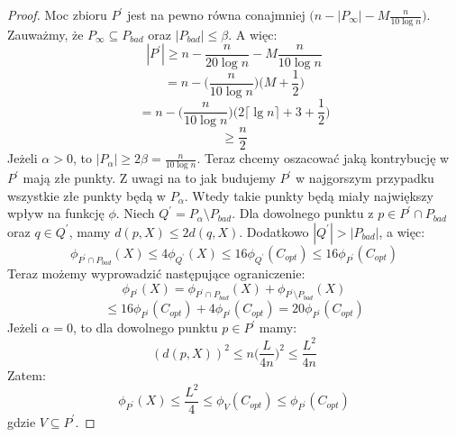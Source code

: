 \begin{proof}
    Moc zbioru $P^{'}$ jest na pewno równa conajmniej $\Big(n - |P_{\infty}| - M\frac{n}{10 \log n} \Big)$.
    Zauważmy, że $P_{\infty} \subseteq P_{bad}$ oraz $|P_{bad}| \leq \beta$.
    A więc:
    \begin{equation}
        |P^{'}| \geq n - \frac{n}{20 \log n} - M \frac{n}{10 \log n}
    \end{equation}
    \begin{equation}
        = n - \Big(\frac{n}{10 \log n}\Big) \Big(M + \frac{1}{2}\Big)
    \end{equation}
    \begin{equation}
        = n - \Big(\frac{n}{10 \log n}\Big) \Big(2 \lceil \lg n \rceil + 3 + \frac{1}{2}\Big)
    \end{equation}
    \begin{equation}
        \geq \frac{n}{2}
    \end{equation}
    Jeżeli $\alpha > 0$, to $|P_{\alpha}| \geq 2\beta = \frac{n}{10 \log n}$.
    Teraz chcemy oszacować jaką kontrybucję w $P^{'}$ mają złe punkty.
    Z uwagi na to jak budujemy $P^{'}$ w najgorszym przypadku wszystkie złe punkty będą w $P_{\alpha}$.
    Wtedy takie punkty będą miały największy wpływ na funkcję $\phi$.
    Niech $Q^{'} = P_{\alpha} \setminus P_{bad}$.
    Dla dowolnego punktu z $p \in P^{'} \cap P_{bad}$ oraz $q \in Q^{'}$, mamy $d(p, X) \leq 2d(q,X)$.
    Dodatkowo $|Q^{'}| > |P_{bad}|$, a więc:
    \begin{equation}
        \phi_{P^{'} \cap P_{bad}}(X) \leq 4\phi_{Q^{'}}(X) \leq 16\phi_{Q^{'}}(C_{opt}) \leq 16\phi_{P^{'}}(C_{opt})
    \end{equation}
    Teraz możemy wyprowadzić następujące ograniczenie:
    \begin{equation}
        \phi_{P^{'}}(X) = \phi_{P^{'} \cap P_{bad}}(X) + \phi_{P^{'} \setminus P_{bad}}(X)
    \end{equation}
    \begin{equation}
        \leq 16\phi_{P^{'}}(C_{opt}) + 4\phi_{P^{'}}(C_{opt}) = 20\phi_{P^{'}}(C_{opt})
    \end{equation}
    Jeżeli $\alpha = 0$, to dla dowolnego punktu $p \in P^{'}$ mamy:
    \begin{equation}
        (d(p,X))^2 \leq n\Big(\frac{L}{4n}\Big)^2 \leq \frac{L^{2}}{4n}
    \end{equation}
    Zatem:
    \begin{equation}
        \phi_{P^{'}}(X) \leq \frac{L^{2}}{4} \leq \phi_{V}(C_{opt}) \leq \phi_{P^{'}}(C_{opt})
    \end{equation}
    gdzie $V \subseteq P^{'}$.
\end{proof}

